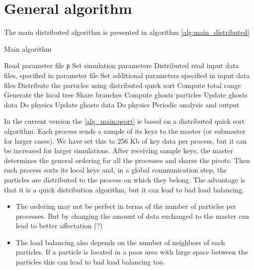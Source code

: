 \documentclass[notes.tex]{subfiles}
\begin{document}
\section{General algorithm}
The main distributed algorithm is presented in algorithm \ref{alg:main_distributed}

\begin{algorithm}
\caption{Main algorithm}\label{alg:main_distributed}
\begin{algorithmic}[1]
\State Read parameter file {\tt p}
\State Set simulation parameters
\State Distributed read input data files, specified in parameter file
\State Set additional parameters specified in input data files
\State Distribute the particles using distributed quick sort 
       \label{alg_main:qsort}
\State Compute total range
\State Generate the local tree
\State Share branches\label{alg_main:share_branches}
\State Compute ghosts particles\label{alg_main:cp_ghosts}
\State Update ghosts data\label{alg_main:up_ghosts}
\State Do physics
\State Update ghosts data
\State Do physics
\State Periodic analysis and output
\EndWhile
\EndProcedure
\end{algorithmic}
\end{algorithm}

In the current version the \ref{alg_main:qsort} is based on a distributed
quick sort algorithm.
Each process sends a sample of its keys to the master (or submaster for larger cases).
We have set this to 256 Kb of key data per process, but it can be increased
for larger simulations.
After receiving sample keys, the master determines the general ordering for
all the processes and shares the pivots.
Then each process sorts its local keys and, in a global communication step,
the particles are distributed to the process on which they belong.
The advantage is that it is a quick distribution algorithm, but it can lead to
bad load balancing.
\begin{itemize}
\item The ordering may not be perfect in terms of the number of particles per
processes. But by changing the amount of data exchanged to the master can lead
to better affectation (?)
\item The load balancing also depends on the number of neighbors of each
particles. If a particle is located in a poor area with large space between the
particles this can lead to bad load balancing too.
\end{itemize}
\end{document}
